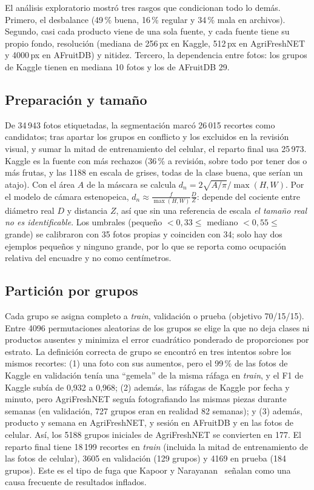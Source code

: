 \documentclass[conference]{IEEEtran}
\begin{document}
El análisis exploratorio mostró tres rasgos que condicionan todo lo demás. Primero, el desbalance (49\,\% buena, 16\,\% regular y 34\,\% mala en archivos). Segundo, casi cada producto viene de una sola fuente, y cada fuente tiene su propio fondo, resolución (mediana de 256\,px en Kaggle, 512\,px en AgriFreshNET y 4000\,px en AFruitDB) y nitidez. Tercero, la dependencia entre fotos: los grupos de Kaggle tienen en mediana 10 fotos y los de AFruitDB 29.

\subsection{Preparación y tamaño}
\label{sec:preparacion}

De 34\,943 fotos etiquetadas, la segmentación marcó 26\,015 recortes como candidatos; tras apartar los grupos en conflicto y los excluidos en la revisión visual, y sumar la mitad de entrenamiento del celular, el reparto final usa 25\,973. Kaggle es la fuente con más rechazos (36\,\% a revisión, sobre todo por tener dos o más frutas, y las 1188 en escala de grises, todas de la clase buena, que serían un atajo). Con el área $A$ de la máscara se calcula $d_n=2\sqrt{A/\pi}/\max(H,W)$. Por el modelo de cámara estenopeica, $d_n\approx\frac{f}{\max(H,W)}\frac{D}{Z}$: depende del cociente entre diámetro real $D$ y distancia $Z$, así que sin una referencia de escala \emph{el tamaño real no es identificable}. Los umbrales (pequeño $<0{,}33\le$ mediano $<0{,}55\le$ grande) se calibraron con 35 fotos propias y coinciden con 34; solo hay dos ejemplos pequeños y ninguno grande, por lo que se reporta como ocupación relativa del encuadre y no como centímetros.

\subsection{Partición por grupos}
\label{sec:particion}

Cada grupo se asigna completo a \emph{train}, validación o prueba (objetivo 70/15/15). Entre 4096 permutaciones aleatorias de los grupos se elige la que no deja clases ni productos ausentes y minimiza el error cuadrático ponderado de proporciones por estrato. La definición correcta de grupo se encontró en tres intentos sobre los mismos recortes: (1) una foto con sus aumentos, pero el 99\,\% de las fotos de Kaggle en validación tenía una ``gemela'' de la misma ráfaga en \emph{train}, y el F1 de Kaggle subía de 0,932 a 0,968; (2) además, las ráfagas de Kaggle por fecha y minuto, pero AgriFreshNET seguía fotografiando las mismas piezas durante semanas (en validación, 727 grupos eran en realidad 82 semanas); y (3) además, producto y semana en AgriFreshNET, y sesión en AFruitDB y en las fotos de celular. Así, los 5188 grupos iniciales de AgriFreshNET se convierten en 177. El reparto final tiene 18\,199 recortes en \emph{train} (incluida la mitad de entrenamiento de las fotos de celular), 3605 en validación (129 grupos) y 4169 en prueba (184 grupos). Este es el tipo de fuga que Kapoor y Narayanan~\cite{kapoor2023} señalan como una causa frecuente de resultados inflados.
\end{document}
